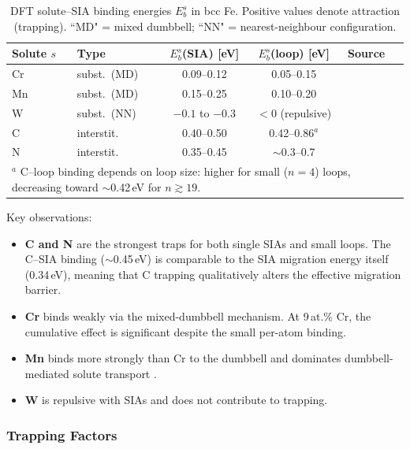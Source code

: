 \documentclass[pdflatex,sn-basic]{sn-jnl} %
\begin{document}
\begin{table}[htbp]
\centering
\caption{DFT solute--SIA binding energies $E_b^{s}$ in bcc Fe.
Positive values denote attraction (trapping). ``MD" = mixed dumbbell;
``NN" = nearest-neighbour configuration.}
\label{tab:Eb_SIA}
\begin{tabular}{llccl}
\toprule
Solute $s$ & Type & $E_b^{s}$(SIA) [eV] & $E_b^{s}$(loop) [eV] & Source\\
\midrule
Cr  & subst.\ (MD) & 0.09--0.12  & 0.05--0.15 & \cite{Olsson2007,Vincent2006,Becquart2018}\\
Mn  & subst.\ (MD) & 0.15--0.25  & 0.10--0.20 & \cite{Messina2020,Olsson2010}\\
W   & subst.\ (NN) & $-0.1$ to $-0.3$ & $<0$ (repulsive) & \cite{Becquart2018}\\
C   & interstit.   & 0.40--0.50  & 0.42--0.86$^a$ & \cite{Domain2004,Terentyev2011_loop,Anento2013}\\
N   & interstit.   & 0.35--0.45  & $\sim$0.3--0.7 & \cite{Domain2004,Becquart2005}\\
\bottomrule
\multicolumn{5}{l}{\footnotesize $^a$ C--loop binding depends on loop size: higher for small ($n=4$) loops, decreasing toward $\sim$0.42\,eV for $n \gtrsim 19$.}
\end{tabular}
\end{table}

Key observations:
\begin{itemize}
    \item \textbf{C and N} are the strongest traps for both single SIAs and small loops.
    The C--SIA binding ($\sim$0.45\,eV) is comparable to the SIA migration energy itself (0.34\,eV), meaning that C trapping qualitatively alters the effective migration barrier.
    \item \textbf{Cr} binds weakly via the mixed-dumbbell mechanism. At 9\,at.\% Cr, the cumulative effect is significant despite the small per-atom binding.
    \item \textbf{Mn} binds more strongly than Cr to the dumbbell and dominates dumbbell-mediated solute transport \citep{Messina2020}.
    \item \textbf{W} is repulsive with SIAs and does not contribute to trapping.
\end{itemize}

\subsubsection{Trapping Factors}
\end{document}
